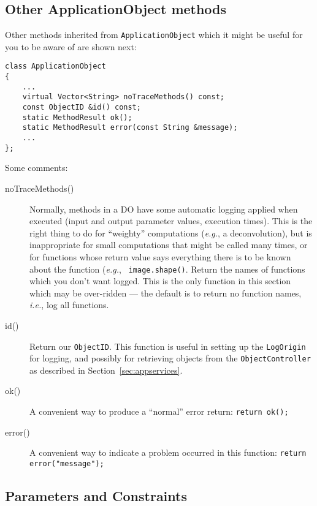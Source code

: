 \subsection{Other ApplicationObject methods}

Other methods inherited from {\tt ApplicationObject} which it might be
useful for you to be aware of are shown next:

\begin{verbatim}
class ApplicationObject
{
    ...
    virtual Vector<String> noTraceMethods() const;
    const ObjectID &id() const;
    static MethodResult ok();
    static MethodResult error(const String &message);
    ...
};
\end{verbatim}

Some comments:

\begin{description}
  \item[noTraceMethods()] Normally, methods in a DO have some
  automatic logging applied when executed (input and output parameter
  values, execution times). This is the right thing to do for
  ``weighty'' computations ({\em e.g.}, a deconvolution), but is
  inappropriate for small computations that might be called many
  times, or for functions whose return value says everything there is
  to be known about the function ({\em e.g.}, {\tt
  image.shape()}. Return the names of functions which you don't want
  logged. This is the only function in this section which may be
  over-ridden --- the default is to return no function names, {\em
  i.e.}, log all functions.

  \item[id()] Return our {\tt ObjectID}. This function is useful
  in setting up the {\tt LogOrigin} for logging, and possibly for
  retrieving objects from the {\tt ObjectController} as described in
  Section~\ref{sec:appservices}.

  \item[ok()] A convenient way to produce a ``normal'' error return:
  {\tt return ok();}

  \item[error()] A convenient way to indicate a problem occurred in
  this function: {\tt return error("message");}
\end{description}

\subsection{Parameters and Constraints}

